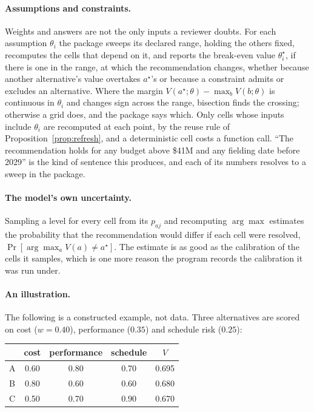 \paragraph{Assumptions and constraints.}
Weights and answers are not the only inputs a reviewer doubts. For each
assumption $\theta_i$ the package sweeps its declared range, holding the
others fixed, recomputes the cells that depend on it, and reports the
break-even value $\theta_i^\star$, if there is one in the range, at which the
recommendation changes, whether because another alternative's value overtakes
$a^\star$'s or because a constraint admits or excludes an alternative. Where
the margin $V(a^\star; \theta) - \max_{b} V(b; \theta)$ is continuous in
$\theta_i$ and changes sign across the range, bisection finds the crossing;
otherwise a grid does, and the package says which. Only cells whose inputs
include $\theta_i$ are recomputed at each point, by the reuse rule of
Proposition~\ref{prop:refresh}, and a deterministic cell costs a function
call. ``The recommendation holds for any budget above \$41M and any fielding
date before 2029'' is the kind of sentence this produces, and each of its
numbers resolves to a sweep in the package.

\paragraph{The model's own uncertainty.}
Sampling a level for every cell from its $p_{aj}$ and recomputing $\arg\max$
estimates the probability that the recommendation would differ if each cell
were resolved, $\Pr[\arg\max_a V(a) \ne a^\star]$. The estimate is as good as
the calibration of the cells it samples, which is one more reason the program
records the calibration it was run under.

\paragraph{An illustration.}
The following is a constructed example, not data. Three alternatives are
scored on cost ($w = 0.40$), performance ($0.35$) and schedule risk ($0.25$):

\begin{center}
\small
\begin{tabular}{@{}lccc|c@{}}
\toprule
 & cost & performance & schedule & $V$ \\
\midrule
A & 0.60 & 0.80 & 0.70 & 0.695 \\
B & 0.80 & 0.60 & 0.60 & 0.680 \\
C & 0.50 & 0.70 & 0.90 & 0.670 \\
\bottomrule
\end{tabular}
\end{center}

